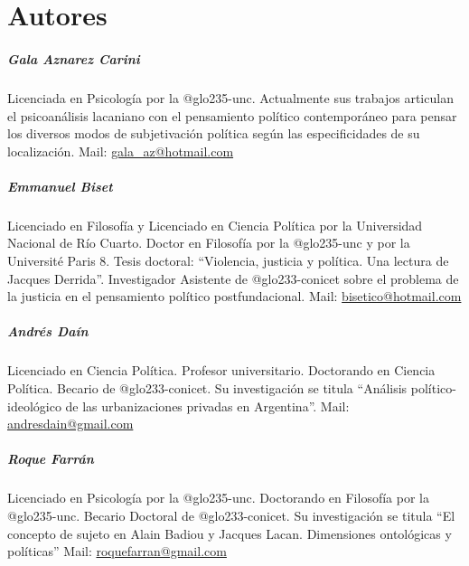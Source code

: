 \backmatter

\chapter[Autores]{Autores}

\paragraph{Gala Aznarez Carini}

Licenciada en Psicología por la \gls{@glo235-unc}. Actualmente sus trabajos articulan el psicoanálisis lacaniano con el pensamiento político contemporáneo para pensar los diversos modos de subjetivación política según las especificidades de su localización. Mail: \url{gala_az@hotmail.com}

\paragraph{Emmanuel Biset}

Licenciado en Filosofía y Licenciado en Ciencia Política por la Universidad Nacional de Río Cuarto. Doctor en Filosofía por la \gls{@glo235-unc} y por la Université Paris 8. Tesis doctoral: \enquote{Violencia, justicia y política. Una lectura de Jacques Derrida}. Investigador Asistente de \gls{@glo233-conicet} sobre el problema de la justicia en el pensamiento político postfundacional. Mail: \url{bisetico@hotmail.com}

\paragraph{Andrés Daín}

Licenciado en Ciencia Política. Profesor universitario. Doctorando en Ciencia Política. Becario de \gls{@glo233-conicet}. Su investigación se titula \enquote{Análisis político-ideológico de las urbanizaciones privadas en Argentina}. Mail: \url{andresdain@gmail.com}

\paragraph{Roque Farrán}

Licenciado en Psicología por la \gls{@glo235-unc}. Doctorando en Filosofía por la \gls{@glo235-unc}. Becario Doctoral de \gls{@glo233-conicet}. Su investigación se titula \enquote{El concepto de sujeto en Alain Badiou y Jacques Lacan. Dimensiones ontológicas y políticas} Mail: \url{roquefarran@gmail.com}

